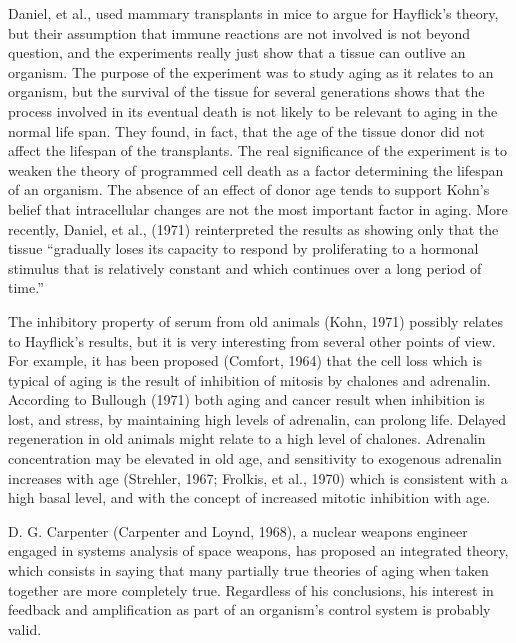 Daniel, et al., used mammary transplants in mice to argue for Hayflick's theory, but their assumption that immune reactions are not involved is not beyond question, and the
experiments really just show that a tissue can outlive an organism. The purpose of the experiment was to study aging as it relates to an organism, but the survival of the tissue
for several generations shows that the process involved in its eventual death is not likely to be relevant to aging in the normal life span. They found, in fact, that the age of the
tissue donor did not affect the lifespan of the transplants. The real significance of the experiment is to weaken the theory of programmed cell death as a factor determining the lifespan
of an organism. The absence of an effect of donor age tends to support Kohn's belief that intracellular changes are not the most important factor in aging. More recently, Daniel, et al., (1971) reinterpreted the
results as showing only that the tissue ``gradually loses its capacity to respond by proliferating to a hormonal stimulus that is relatively constant and which continues over a long period of time.''

The inhibitory property of serum from old animals (Kohn, 1971) possibly relates to Hayflick's results, but it is very interesting from several other points of view. For example, it has been
proposed (Comfort, 1964) that the cell loss which is typical of aging is the result of inhibition of mitosis by chalones and adrenalin. According to Bullough (1971) both aging and cancer result
when inhibition is lost, and stress, by maintaining high levels of adrenalin, can prolong life. Delayed regeneration in old animals might relate to a high level of chalones. Adrenalin
concentration may be elevated in old age, and sensitivity to exogenous adrenalin increases with age (Strehler, 1967; Frolkis, et al., 1970) which is consistent with a high basal level, and with
the concept of increased mitotic inhibition with age.

D. G. Carpenter (Carpenter and Loynd, 1968), a nuclear weapons engineer engaged in systems analysis of space weapons, has proposed an integrated theory, which consists in saying that many partially
true theories of aging when taken together are more completely true. Regardless of his conclusions, his interest in feedback and amplification as part of an organism's control system is probably valid.

